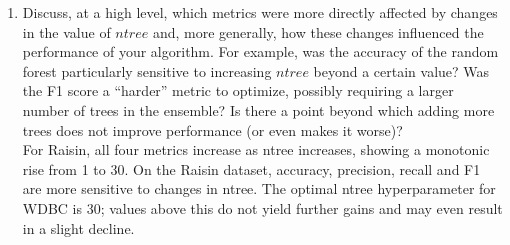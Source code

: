 \documentclass{article}
\begin{document}
\begin{enumerate}
\textbf{Raisin ntree:}
\begin{itemize}
    \item Accuracy: 30\\
because it gives the highest accuracy.
    \item Precision: 30\\
because it gives the highest precision.
    \item Recall: 30\\
because these three values achieve the same highest recall.
    \item F1: 30\\
because it gives the highest f1.
\end{itemize}

\newpage
    \item Discuss, at a high level, which metrics were more directly affected by changes in the value of $ntree$ and, more generally, how these changes influenced the performance of your algorithm. For example, was the accuracy of the random forest particularly sensitive to increasing $ntree$ beyond a certain value? Was the F1 score a ``harder'' metric to optimize, possibly requiring a larger number of trees in the ensemble? Is there a point beyond which adding more trees does not improve performance (or even makes it worse)?\\

For Raisin, all four metrics increase as ntree increases, showing a monotonic rise from 1 to 30. On the Raisin dataset, accuracy, precision, recall and F1 are more sensitive to changes in ntree. The optimal ntree hyperparameter for WDBC is 30; values above this do not yield further gains and may even result in a slight decline.\\
\end{enumerate}
\end{document}
